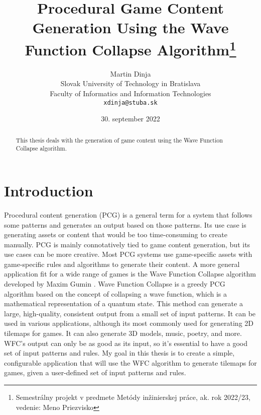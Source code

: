 \documentclass[10pt,twoside,a4paper]{article}
\title{Procedural Game Content Generation Using the Wave Function Collapse Algorithm\thanks{Semestrálny projekt v predmete Metódy inžinierskej práce, ak. rok 2022/23, vedenie: Meno Priezvisko}}
\author{Martin Dinja\\[2pt]
	{\small Slovak University of Technology in Bratislava}\\
	{\small Faculty of Informatics and Information Technologies}\\
	{\small \texttt{xdinja@stuba.sk}}
}
\date{\small 30. september 2022}
\begin{document}
\maketitle

\tableofcontents

\begin{abstract}
    \begin{center}
        This thesis deals with the generation of game content using the Wave Function Collapse algorithm. 
    \end{center}
\end{abstract}

\section{Introduction}\label{sec:introduction}

Procedural content generation (PCG) is a general term for a system that follows some patterns and generates an output based on those patterns.
Its use case is generating assets or content that would be too time-consuming to create manually.
PCG is mainly connotatively tied to game content generation, but its use cases can be more creative.
Most PCG systems use game-specific assets with game-specific rules and algorithms to generate their content.
A more general application fit for a wide range of games is the Wave Function Collapse algorithm developed by Maxim Gumin \cite{WFC}.
Wave Function Collapse is a greedy PCG algorithm based on the concept of collapsing a wave function, which is a mathematical representation of a quantum state.
This method can generate a large, high-quality, consistent output from a small set of input patterns.
It can be used in various applications, although its most commonly used for generating 2D tilemaps for games.
It can also generate 3D models, music, poetry, and more.
WFC's output can only be as good as its input, so it's essential to have a good set of input patterns and rules. 
My goal in this thesis is to create a simple, configurable application that will use the WFC algorithm to generate tilemaps for games, given a user-defined set of input patterns and rules.
\end{document}

